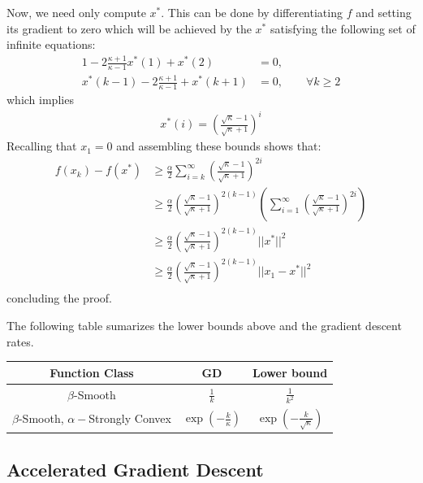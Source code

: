 Now, we need only compute $x^*$. This can be done by  differentiating $f$ and setting its gradient to zero which will be achieved by the $x^*$ satisfying the following set of infinite equations:
\begin{align*}
    1-2\frac{\kappa+1}{\kappa-1} x^*(1) + x^*(2) &= 0, \\
    x^*(k-1) - 2\frac{\kappa+1}{\kappa-1} + x^*(k+1) &= 0, \qquad \forall k \geq 2
\end{align*}
which implies
\begin{align*}
x^*(i) = \left( \frac{\sqrt{\kappa} - 1}{\sqrt{\kappa} +1} \right)^i 
\end{align*}
Recalling that $x_1 =0$ and assembling these bounds shows that:
\begin{align*}
 f(x_k) - f(x^*) &\geq \frac{\alpha}{2}\sum_{i=k}^\infty \left( \frac{\sqrt{\kappa} - 1}{\sqrt{\kappa} +1} \right)^{2i}  \\
 &\geq \frac{\alpha}{2} \left( \frac{\sqrt{\kappa} - 1}{\sqrt{\kappa} +1} \right)^{2(k-1)} \left( \sum_{i=1}^\infty \left( \frac{\sqrt{\kappa} - 1}{\sqrt{\kappa} +1} \right)^{2i} \right) \\
 &\geq \frac{\alpha}{2} \left( \frac{\sqrt{\kappa} - 1}{\sqrt{\kappa} +1} \right)^{2(k-1)} || x^* ||^2 \\
 &\geq \frac{\alpha}{2} \left( \frac{\sqrt{\kappa} - 1}{\sqrt{\kappa} +1} \right)^{2(k-1)} || x_1 - x^* ||^2\\
\end{align*}
concluding the proof.

\proofend

The following table sumarizes the lower bounds above and the gradient descent rates. 

\begin{center}
 \begin{tabular}{||c c c ||} 
 \hline
 Function Class   & GD  & Lower bound \\ [0.5ex] 
 \hline\hline
 $\beta$-Smooth & $\frac{1}{k}$ &  $\frac{1}{k^2}$\\ [1ex]
 \hline
 $\beta$-Smooth, $\alpha-$Strongly Convex  &  $\exp\left(-\frac{k}{\kappa}\right)$ &  $\exp\left(-\frac{k}{\sqrt{\kappa}}  \right)$ \\ [1ex]
 \hline
\end{tabular}
\end{center}

\subsection{Accelerated Gradient Descent }

